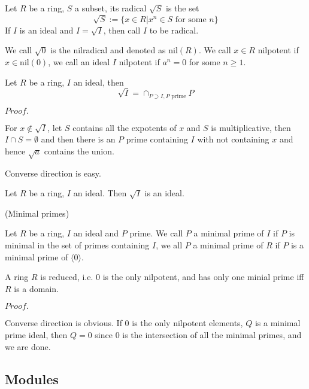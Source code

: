 \documentclass{article}
\newcommand{\Pf}[1]{$Proof.$\par}
\begin{document}
\begin{definition}
    Let $R$ be a ring, $S$ a subset, its radical $\sqrt{S}$ is the set
    \[
    \sqrt{S}:=\{x\in R|x^n\in S\text{ for some }n\}
    \]
    If $I$ is an ideal and $I=\sqrt{I}$, then call $I$ to be radical.\par
    We call $\sqrt{0}$ is the nilradical and denoted as $\text{nil}(R)$. We call $x\in R$ nilpotent if $x\in \text{nil}(0)$, we call an ideal $I$ nilpotent if $a^n = 0$ for some $n\geq 1$.
\end{definition}

\begin{theorem}
    Let $R$ be a ring, $I$ an ideal, then
    \[
    \sqrt{I} = \cap_{P\supset I,P\text { prime}} P\]
\end{theorem}
\Pf\par
    For $x\notin\sqrt{I}$, let $S$ contains all the expotents of $x$ and $S$ is multiplicative, then $I\cap S = \emptyset$ and then there is an $P$ prime containing $I$ with not containing $x$ and hence $\sqrt{a}$ contains the union.\par
    Converse direction is easy.

\begin{proposition}
    Let $R$ be a ring, $I$ an ideal. Then $\sqrt{I}$ is an ideal.
\end{proposition}

\begin{definition}
    (Minimal primes)\par
    Let $R$ be a ring, $I$ an ideal and $P$ prime. We call $P$ a minimal prime of $I$ if $P$ is minimal in the set of primes containing $I$, we all $P$ a minimal prime of $R$ if $P$ is a minimal prime of $\langle 0 \rangle$.
\end{definition}

\begin{proposition}
A ring $R$ is reduced, i.e. $0$ is the only nilpotent, and has only one minial prime iff $R$ is a domain.
\end{proposition}
\Pf\par
    Converse direction is obvious. If $0$ is the only nilpotent elements, $Q$ is a minimal prime ideal, then $Q = 0$ since $0$ is the intersection of all the minimal primes, and we are done. 

\subsection{Modules}
\end{document}
